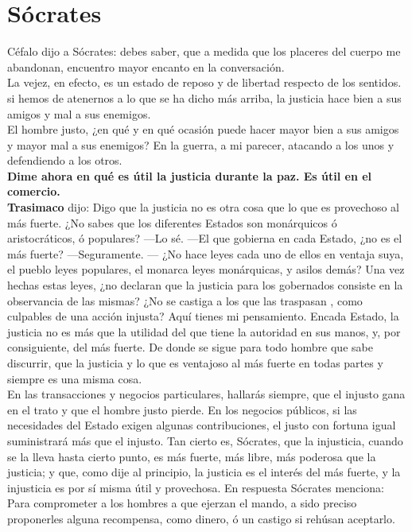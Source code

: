 \documentclass[10pt]{book}
\begin{document}
\section*{Sócrates}
Céfalo dijo a Sócrates:  debes saber, que a medida que los placeres del cuerpo me abandonan, encuentro mayor encanto en la conversación.\\
La vejez, en efecto, es un estado de reposo y de libertad respecto de los sentidos. \\
si hemos de atenernos a lo que se ha dicho más arriba, la justicia hace bien a sus amigos y mal a sus enemigos. \\
El hombre justo, ¿en qué y en qué ocasión puede hacer mayor bien a sus amigos y mayor mal a sus enemigos? En la guerra, a mi parecer, atacando a los unos y defendiendo a los otros. \\
\textbf{Dime ahora en qué es útil la justicia durante la paz. Es útil en el comercio.}\\
\textbf{Trasimaco} dijo: Digo que la justicia no es otra cosa que lo que es provechoso al más fuerte. ¿No sabes que los diferentes Estados son monárquicos ó aristocráticos, ó populares? —Lo sé. —El que gobierna en cada Estado, ¿no es el más fuerte? —Seguramente. — ¿No hace leyes cada uno de ellos en ventaja suya, el pueblo leyes populares, el monarca leyes monárquicas, y asilos demás? Una vez hechas estas leyes, ¿no declaran que la justicia para los gobernados consiste en la observancia de las mismas? ¿No se castiga a los que las traspasan , como culpables de una acción injusta? Aquí tienes mi pensamiento. Encada Estado, la justicia no es más que la utilidad del que tiene la autoridad en sus manos, y, por consiguiente, del más fuerte. De donde se sigue para todo hombre que sabe discurrir, que la justicia y lo que es ventajoso al más fuerte en todas partes y siempre es una misma cosa.\\
En las transacciones y negocios particulares, hallarás siempre, que el injusto gana en el trato y que el hombre justo pierde. En los negocios públicos, si las necesidades del Estado exigen algunas contribuciones, el justo con fortuna igual suministrará más que el injusto. Tan cierto es, Sócrates, que la injusticia, cuando se la lleva hasta cierto punto, es más fuerte, más libre, más poderosa que la justicia; y que, como dije al principio, la justicia es el interés del más fuerte, y la injusticia es por sí misma útil y provechosa. 
En respuesta Sócrates menciona: Para comprometer a los hombres a que ejerzan el mando, a sido preciso proponerles alguna recompensa, como dinero, ó un castigo si rehúsan aceptarlo. \\
\end{document}
